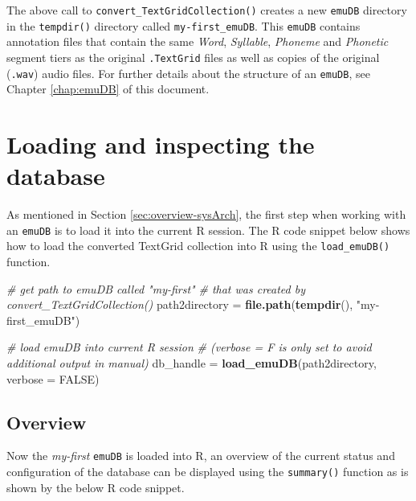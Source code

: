 \documentclass[]{book}
\newenvironment{Shaded}{\begin{snugshade}}{\end{snugshade}}
\newcommand{\CommentTok}[1]{\textcolor[rgb]{0.56,0.35,0.01}{\textit{#1}}}
\newcommand{\DataTypeTok}[1]{\textcolor[rgb]{0.13,0.29,0.53}{#1}}
\newcommand{\KeywordTok}[1]{\textcolor[rgb]{0.13,0.29,0.53}{\textbf{#1}}}
\newcommand{\NormalTok}[1]{#1}
\newcommand{\OtherTok}[1]{\textcolor[rgb]{0.56,0.35,0.01}{#1}}
\newcommand{\StringTok}[1]{\textcolor[rgb]{0.31,0.60,0.02}{#1}}
\begin{document}
The above call to \texttt{convert\_TextGridCollection()} creates a new \texttt{emuDB} directory in the \texttt{tempdir()} directory called \texttt{my-first\_emuDB}. This \texttt{emuDB} contains annotation files that contain the same \emph{Word}, \emph{Syllable}, \emph{Phoneme} and \emph{Phonetic} segment tiers as the original \texttt{.TextGrid} files as well as copies of the original (\texttt{.wav}) audio files. For further details about the structure of an \texttt{emuDB}, see Chapter \ref{chap:emuDB} of this document.

\hypertarget{loading-and-inspecting-the-database}{%
\section{Loading and inspecting the database}\label{loading-and-inspecting-the-database}}

As mentioned in Section \ref{sec:overview-sysArch}, the first step when working with an \texttt{emuDB} is to load it into the current R session. The R code snippet below shows how to load the converted TextGrid collection into R using the \texttt{load\_emuDB()} function.

\begin{Shaded}
\begin{Highlighting}[]
\CommentTok{# get path to emuDB called "my-first"}
\CommentTok{# that was created by convert_TextGridCollection()}
\NormalTok{path2directory =}\StringTok{ }\KeywordTok{file.path}\NormalTok{(}\KeywordTok{tempdir}\NormalTok{(), }\StringTok{"my-first_emuDB"}\NormalTok{)}

\CommentTok{# load emuDB into current R session}
\CommentTok{# (verbose = F is only set to avoid additional output in manual)}
\NormalTok{db_handle =}\StringTok{ }\KeywordTok{load_emuDB}\NormalTok{(path2directory, }
                       \DataTypeTok{verbose =} \OtherTok{FALSE}\NormalTok{)}
\end{Highlighting}
\end{Shaded}

\hypertarget{overview}{%
\subsection{Overview}\label{overview}}

Now the \emph{my-first} \texttt{emuDB} is loaded into R, an overview of the current status and configuration of the database can be displayed using the \texttt{summary()} function as is shown by the below R code snippet.
\end{document}
